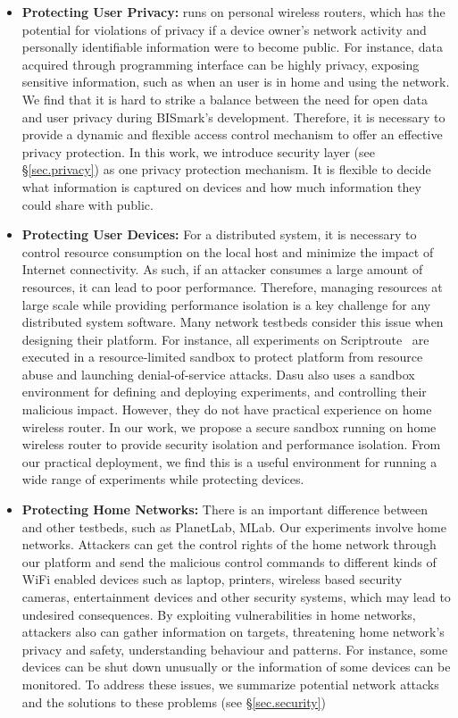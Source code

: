 \begin{itemize}
\item \textbf{Protecting User Privacy:} \sysname runs on personal wireless routers, which has the potential for violations of privacy if a device owner's network activity and personally identifiable information were to become public. For instance, data acquired through programming interface can be highly privacy, exposing sensitive information, such as when an user is in home and using the network. We find that it is hard to strike a balance between the need for open data and user privacy during BISmark's development. Therefore, it is necessary to provide a dynamic and flexible access control mechanism to offer an effective privacy protection. In this work, we introduce security layer (see \S{\ref{sec.privacy}}) as one privacy protection mechanism. It is flexible to decide what information is captured on devices and how much information they could share with public. 

\item \textbf{Protecting User Devices:} For a distributed system, it is necessary to control resource consumption on the local host and minimize the impact of Internet connectivity. As such, if an attacker consumes a large amount of resources, it can lead to poor performance. Therefore, managing resources at large scale while providing performance isolation is a key challenge for any distributed system software. Many network testbeds consider this issue when designing their platform. For instance, all experiments on Scriptroute~\cite{spring2003scriptroute} are executed in a resource-limited sandbox to protect platform from resource abuse and launching denial-of-service attacks. Dasu also uses a sandbox environment for defining and deploying experiments, and controlling their malicious impact. However, they do not have practical experience on home wireless router. In our work, we propose a secure sandbox running on home wireless router to provide security isolation and performance isolation. From our practical deployment, we find this is a useful environment for running a wide range of experiments while protecting devices.

\item \textbf{Protecting Home Networks:} There is an important difference between \sysname and other testbeds, such as PlanetLab, MLab. Our experiments involve home networks. Attackers can get the control rights of the home network through our platform and send the malicious control commands to different kinds of WiFi enabled devices such as laptop, printers, wireless based security cameras, entertainment devices and other security systems, which may lead to undesired consequences. By exploiting vulnerabilities in home networks, attackers also can gather information on targets, threatening home network's privacy and safety, understanding behaviour and patterns. For instance, some devices can be shut down unusually or the information of some devices can be monitored. To address these issues, we summarize potential network attacks and the solutions to these problems (see \S{\ref{sec.security}})
\end{itemize}

